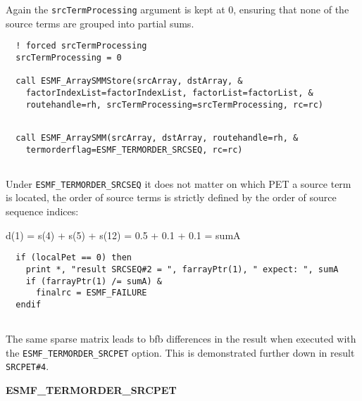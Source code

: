 
   Again the {\tt srcTermProcessing} argument is kept at 0, ensuring that none
   of the source terms are grouped into partial sums.
   

 \begin{verbatim}
  ! forced srcTermProcessing
  srcTermProcessing = 0
  
  call ESMF_ArraySMMStore(srcArray, dstArray, &
    factorIndexList=factorIndexList, factorList=factorList, &
    routehandle=rh, srcTermProcessing=srcTermProcessing, rc=rc)
 
\end{verbatim}
 

 \begin{verbatim}
  call ESMF_ArraySMM(srcArray, dstArray, routehandle=rh, &
    termorderflag=ESMF_TERMORDER_SRCSEQ, rc=rc)
 
\end{verbatim}
 

   Under {\tt ESMF\_TERMORDER\_SRCSEQ} it does not matter on which PET a
   source term is located, the order of source terms is strictly defined by the
   order of source sequence indices:
  
       d(1) = s(4) + s(5) + s(12) = 0.5 + 0.1 + 0.1 = sumA
   

 \begin{verbatim}
  if (localPet == 0) then
    print *, "result SRCSEQ#2 = ", farrayPtr(1), " expect: ", sumA
    if (farrayPtr(1) /= sumA) &
      finalrc = ESMF_FAILURE
  endif
 
\end{verbatim}
 

   The same sparse matrix leads to bfb differences in the result when executed
   with the {\tt ESMF\_TERMORDER\_SRCPET} option. This is demonstrated further
   down in result {\tt SRCPET\#4}. 

   {\bf ESMF\_TERMORDER\_SRCPET}
  
